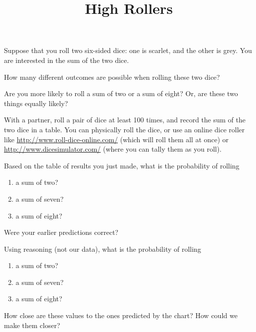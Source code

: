 \documentclass[noauthor,nooutcomes,handout]{ximera}
\title{High Rollers}
\begin{document}
\begin{abstract}
\end{abstract}
\maketitle


Suppose that you roll two six-sided dice: one is scarlet, and the other is grey.  You are interested in the sum of the two dice.

\begin{problem}
How many different outcomes are possible when rolling these two dice?
\end{problem}

\begin{problem} 
Are you more likely to roll a sum of two or a sum of eight?  Or, are these two things equally likely?
\end{problem}

With a partner, roll a pair of dice at least 100 times, and record the sum of the two dice in a table.  You can physically roll the dice, or use an online dice roller like \url{http://www.roll-dice-online.com/} (which will roll them all at once) or \url{http://www.dicesimulator.com/} (where you can tally them as you roll).


\begin{problem}
Based on the table of results you just made, what is the probability of rolling
\begin{enumerate}
\item a sum of two?
\item a sum of seven?
\item a sum of eight?
\end{enumerate}
Were your earlier predictions correct?
\end{problem}

\begin{problem}
Using reasoning (not our data), what is the probability of rolling
\begin{enumerate}
\item a sum of two?
\item a sum of seven?
\item a sum of eight?
\end{enumerate}
How close are these values to the ones predicted by the chart?  How could we make them closer?
\end{problem}

\newpage
\end{document}
